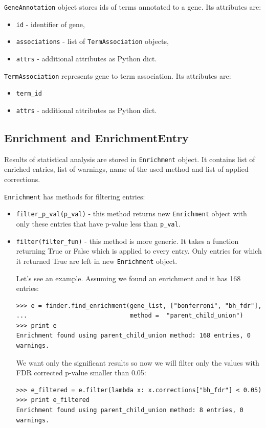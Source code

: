 \documentclass{report}
\begin{document}
\verb|GeneAnnotation| object stores ids of terms annotated to a gene.
Its attributes are:
\begin{itemize}
\item \verb|id| - identifier of gene,
\item \verb|associations| - list of \verb|TermAssociation| objects,
\item \verb|attrs| - additional attributes as Python dict.
\end{itemize}

\verb|TermAssociation| represents gene to term association.
Its attributes are:
\begin{itemize}
\item \verb|term_id|
\item \verb|attrs| - additional attributes as Python dict.
\end{itemize}

\subsection{Enrichment and EnrichmentEntry}
Results of statistical analysis are stored in \verb|Enrichment| object. It
contains list of enriched entries, list of warnings, name of the used method
and list of applied corrections.

\verb|Enrichment| has methods for filtering entries:
\begin{itemize}
\item \verb|filter_p_val(p_val)| - this method returns new \verb|Enrichment|
object with only these entries that have p-value less than \verb|p_val|.

\item \verb|filter(filter_fun)| - this method is more generic. It takes
a function returning True or False which is applied to every entry. Only entries
for which it returned True are left in new \verb|Enrichment| object.

Let's see an example. Assuming we found an enrichment and it has 168 entries:
\begin{verbatim}
>>> e = finder.find_enrichment(gene_list, ["bonferroni", "bh_fdr"],
...                            method =  "parent_child_union")
>>> print e
Enrichment found using parent_child_union method: 168 entries, 0 warnings.
\end{verbatim}
We want only the significant results so now we will filter only the values
with FDR corrected p-value smaller than 0.05:
\begin{verbatim}
>>> e_filtered = e.filter(lambda x: x.corrections["bh_fdr"] < 0.05)
>>> print e_filtered
Enrichment found using parent_child_union method: 8 entries, 0 warnings.
\end{verbatim}

\end{itemize}
\end{document}
